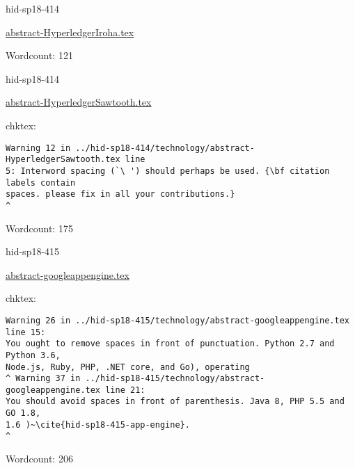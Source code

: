 \begin{IU}

hid-sp18-414

\href{https://github.com/cloudmesh-community/hid-sp18-414/blob/master//technology/abstract-HyperledgerIroha.tex}{abstract-HyperledgerIroha.tex}

 

Wordcount: 121

\end{IU}



\begin{IU}

hid-sp18-414

\href{https://github.com/cloudmesh-community/hid-sp18-414/blob/master//technology/abstract-HyperledgerSawtooth.tex}{abstract-HyperledgerSawtooth.tex}

 
chktex:
\begin{tiny}
\begin{verbatim}
Warning 12 in ../hid-sp18-414/technology/abstract-HyperledgerSawtooth.tex line
5: Interword spacing (`\ ') should perhaps be used. {\bf citation labels contain
spaces. please fix in all your contributions.}
^
\end{verbatim}
\end{tiny}

Wordcount: 175

\end{IU}



\begin{IU}

hid-sp18-415

\href{https://github.com/cloudmesh-community/hid-sp18-415/blob/master//technology/abstract-googleappengine.tex}{abstract-googleappengine.tex}

 
chktex:
\begin{tiny}
\begin{verbatim}
Warning 26 in ../hid-sp18-415/technology/abstract-googleappengine.tex line 15:
You ought to remove spaces in front of punctuation. Python 2.7 and Python 3.6,
Node.js, Ruby, PHP, .NET core, and Go), operating
^ Warning 37 in ../hid-sp18-415/technology/abstract-googleappengine.tex line 21:
You should avoid spaces in front of parenthesis. Java 8, PHP 5.5 and GO 1.8,
1.6 )~\cite{hid-sp18-415-app-engine}.                                     ^
\end{verbatim}
\end{tiny}

Wordcount: 206

\end{IU}

